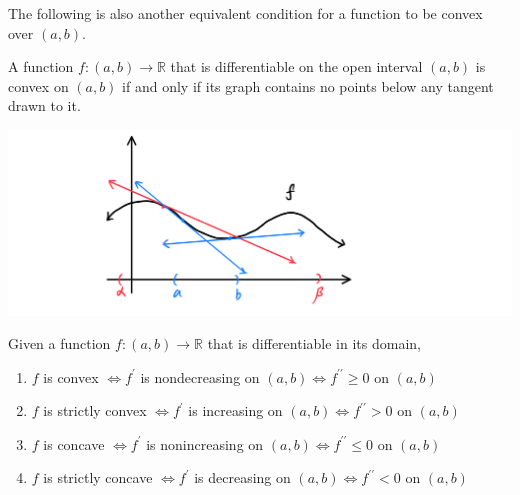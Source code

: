 \documentclass{article}
\begin{document}
    The following is also another equivalent condition for a function to be convex over $(a, b)$. 

    \begin{proposition}
    A function $f: (a, b) \longrightarrow \mathbb{R}$ that is differentiable on the open interval $(a, b)$ is convex on $(a, b)$ if and only if its graph contains no points below any tangent drawn to it.
    \begin{center}
        \includegraphics[scale=0.25]{img/Convex_Function_Over_Tangent_Line.PNG}
    \end{center}
    \end{proposition}

    \begin{theorem}
    Given a function $f: (a, b) \longrightarrow \mathbb{R}$ that is differentiable in its domain, 
    \begin{enumerate}
      \item $f$ is convex $\iff f^\prime$ is nondecreasing on $(a, b) \iff f^{\prime\prime} \geq 0$ on $(a, b)$ 
      \item $f$ is strictly convex $\iff f^\prime$ is increasing on $(a, b) \iff f^{\prime\prime} > 0$ on $(a, b)$ 
      \item $f$ is concave $\iff f^\prime$ is nonincreasing on $(a, b) \iff f^{\prime\prime} \leq 0$ on $(a, b)$ 
      \item $f$ is strictly concave $\iff f^\prime$ is decreasing on $(a, b) \iff f^{\prime\prime} < 0$ on $(a, b)$ 
    \end{enumerate}
    \end{theorem}
\end{document}

